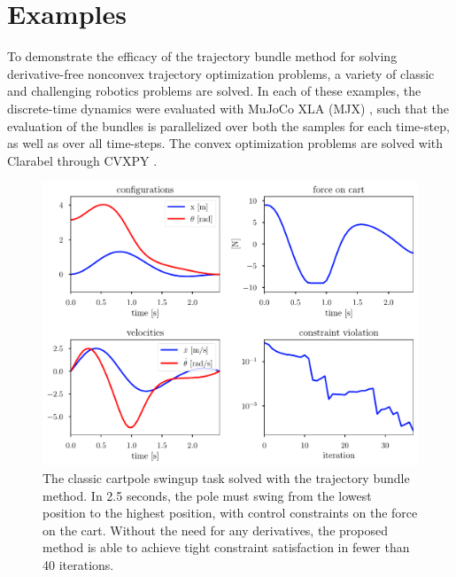 %
%
%
\section{Examples}
%
%
%
To demonstrate the efficacy of the trajectory bundle method for solving derivative-free nonconvex trajectory optimization problems, a variety of classic and challenging robotics problems are solved. In each of these examples, the discrete-time dynamics were evaluated with MuJoCo XLA (MJX) \cite{todorov2012}, such that the evaluation of the bundles is parallelized over both the samples for each time-step, as well as over all time-steps. The convex optimization problems are solved with Clarabel \cite{goulart2024} through CVXPY \cite{diamond}.


\begin{figure}
    \centering
    \includegraphics[width=0.9\linewidth]{bundles/examples/cartpole_fig.pdf}
    \caption{The classic cartpole swingup task solved with the trajectory bundle method. In 2.5 seconds, the pole must swing from the lowest position to the highest position, with control constraints on the force on the cart. Without the need for any derivatives, the proposed method is able to achieve tight constraint satisfaction in fewer than 40 iterations.}
    \label{fig:btb:cartpole}
\end{figure}

